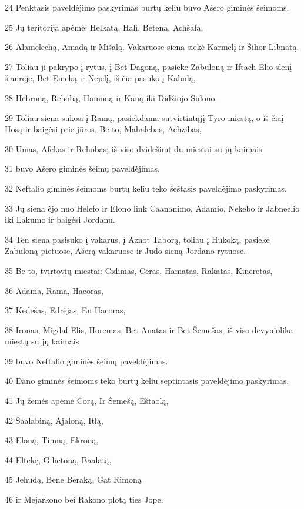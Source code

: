 \par 24 Penktasis paveldėjimo paskyrimas burtų keliu buvo Ašero giminės šeimoms. 
\par 25 Jų teritorija apėmė: Helkatą, Halį, Beteną, Achšafą, 
\par 26 Alamelechą, Amadą ir Mišalą. Vakaruose siena siekė Karmelį ir Šihor Libnatą. 
\par 27 Toliau ji pakrypo į rytus, į Bet Dagoną, pasiekė Zabuloną ir Iftach Elio slėnį šiaurėje, Bet Emeką ir Nejelį, iš čia pasuko į Kabulą, 
\par 28 Hebroną, Rehobą, Hamoną ir Kaną iki Didžiojo Sidono. 
\par 29 Toliau siena sukosi į Ramą, pasiekdama sutvirtintąjį Tyro miestą, o iš čia­į Hosą ir baigėsi prie jūros. Be to, Mahalebas, Achzibas, 
\par 30 Umas, Afekas ir Rehobas; iš viso dvidešimt du miestai su jų kaimais 
\par 31 buvo Ašero giminės šeimų paveldėjimas. 
\par 32 Neftalio giminės šeimoms burtų keliu teko šeštasis paveldėjimo paskyrimas. 
\par 33 Jų siena ėjo nuo Helefo ir Elono link Caananimo, Adamio, Nekebo ir Jabneelio iki Lakumo ir baigėsi Jordanu. 
\par 34 Ten siena pasisuko į vakarus, į Aznot Taborą, toliau į Hukoką, pasiekė Zabuloną pietuose, Ašerą vakaruose ir Judo sieną Jordano rytuose. 
\par 35 Be to, tvirtovių miestai: Cidimas, Ceras, Hamatas, Rakatas, Kineretas, 
\par 36 Adama, Rama, Hacoras, 
\par 37 Kedešas, Edrėjas, En Hacoras, 
\par 38 Ironas, Migdal Elis, Horemas, Bet Anatas ir Bet Šemešas; iš viso devyniolika miestų su jų kaimais 
\par 39 buvo Neftalio giminės šeimų paveldėjimas. 
\par 40 Dano giminės šeimoms teko burtų keliu septintasis paveldėjimo paskyrimas. 
\par 41 Jų žemės apėmė Corą, Ir Šemešą, Eštaolą, 
\par 42 Šaalabiną, Ajaloną, Itlą, 
\par 43 Eloną, Timną, Ekroną, 
\par 44 Eltekę, Gibetoną, Baalatą, 
\par 45 Jehudą, Bene Beraką, Gat Rimoną 
\par 46 ir Mejarkono bei Rakono plotą ties Jope. 
